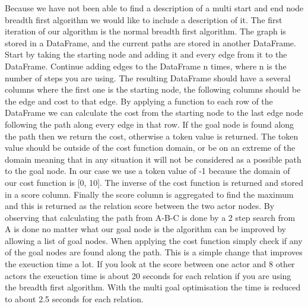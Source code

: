Because we have not been able to find a description of a multi start and end node breadth first algorithm we would like to include a description of it. The first iteration of our algorithm is the normal breadth first algorithm. The graph is stored in a DataFrame, and the current paths are stored in another DataFrame. Start by taking the starting node and adding it and every edge from it to the DataFrame. Continue adding edges to the DataFrame n times, where n is the number of steps you are using. The resulting DataFrame should have a several columns where the first one is the starting node, the following columns should be the edge and cost to that edge. By applying a function to each row of the DataFrame we can calculate the cost from the starting node to the last edge node following the path along every edge in that row. If the goal node is found along the path then we return the cost, otherwise a token value is returned. The token value should be outside of the cost function domain, or be on an extreme of the domain meaning that in any situation it will not be considered as a possible path to the goal node. In our case we use a token value of -1 because the domain of our cost function is [0, 10]. The inverse of the cost function is returned and stored in a score column. Finally the score column is aggregated to find the maximum and this is returned as the relation score between the two actor nodes. By observing that calculating the path from A-B-C is done by a 2 step search from A is done no matter what our goal node is the algorithm can be improved by allowing a list of goal nodes. When applying the cost function simply check if any of the goal nodes are found along the path. This is a simple change that improves the exeuction time a lot. If you look at the score between one actor and 8 other actors the exeuction time is about 20 seconds for each relation if you are using the breadth first algorithm. With the multi goal optimisation the time is reduced to about 2.5 seconds for each relation. 



